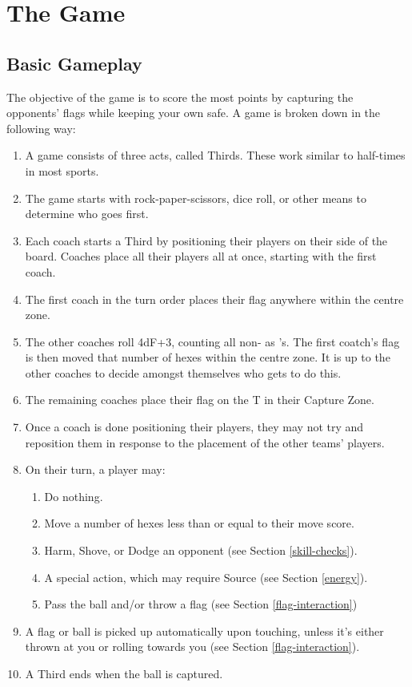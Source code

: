 \chapter{The Game}
\section{Basic Gameplay} \label{basic-gameplay}
The objective of the game is to score the most points by capturing the opponents' flags while keeping your own safe.
A game is broken down in the following way:
\begin{enumerate}
    \item A game consists of three acts, called Thirds.
    These work similar to half-times in most sports.
    \item The game starts with rock-paper-scissors, dice roll, or other means to determine who goes first.
    \item Each coach starts a Third by positioning their players on their side of the board.
    Coaches place all their players all at once, starting with the first coach.
    \item The first coach in the turn order places their flag anywhere within the centre zone.
    \item The other coaches roll 4dF+3, counting all non-\blank{} as \plus{}'s. The first coatch's flag is then moved that number of hexes within the centre zone.
    It is up to the other coaches to decide amongst themselves who gets to do this.
    \item The remaining coaches place their flag on the T in their Capture Zone.
    \item Once a coach is done positioning their players, they may not try and reposition them in response to the placement of the other teams' players.
    \item On their turn, a player may:
    \begin{enumerate}
        \item Do nothing.
        \item Move a number of hexes less than or equal to their move score.
        \item Harm, Shove, or Dodge an opponent (see Section \ref{skill-checks}).
        \item A special action, which may require Source (see Section \ref{energy}).
        \item Pass the ball and/or throw a flag (see Section \ref{flag-interaction})
    \end{enumerate}
    \item A flag or ball is picked up automatically upon touching, unless it’s either thrown at you or rolling towards you (see Section \ref{flag-interaction}).
    \item A Third ends when the ball is captured.
\end{enumerate}

